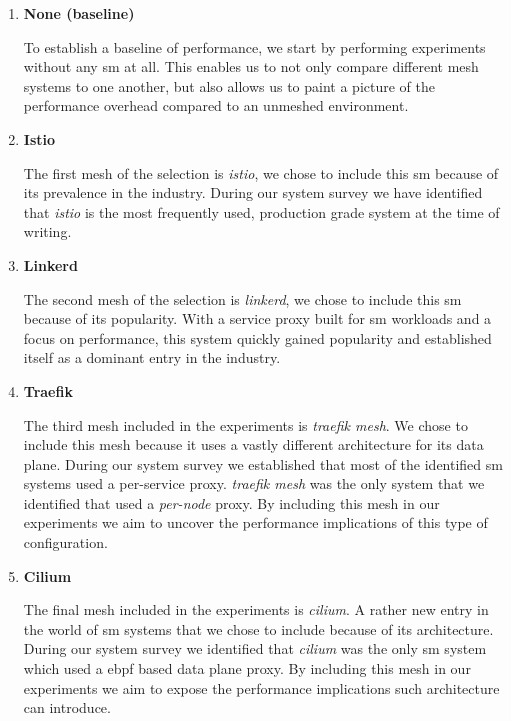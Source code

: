 \begin{enumerate}[label=\textbf{SM\arabic*}, leftmargin=3\parindent]
    \item \textbf{None (baseline)}
    \label{exp:sm:0}
    
    To establish a baseline of performance, we start by performing experiments without any \gls{sm} at all. This enables us to not only compare different mesh systems to one another, but also allows us to paint a picture of the performance overhead compared to an unmeshed environment.
    
    \item \textbf{Istio}
    \label{exp:sm:1}
   
    The first mesh of the selection is \textit{istio}, we chose to include this \gls{sm} because of its prevalence in the industry. During our system survey we have identified that \textit{istio} is the most frequently used, production grade system at the time of writing.
    
    \item \textbf{Linkerd}
    \label{exp:sm:2}
   
    The second mesh of the selection is \textit{linkerd}, we chose to include this \gls{sm} because of its popularity. With a service proxy built for \gls{sm} workloads and a focus on performance, this system quickly gained popularity and established itself as a dominant entry in the industry.

    \item \textbf{Traefik}
    \label{exp:sm:3}
    
    The third mesh included in the experiments is \textit{traefik mesh}. We chose to include this mesh because it uses a vastly different architecture for its data plane. During our system survey we established that most of the identified \gls{sm} systems used a per-service proxy. \textit{traefik mesh} was the only system that we identified that used a \textit{per-node} proxy. By including this mesh in our experiments we aim to uncover the performance implications of this type of configuration.
    
    \item \textbf{Cilium}
    \label{exp:sm:4}
    
    The final mesh included in the experiments is \textit{cilium}. A rather new entry in the world of \gls{sm} systems that we chose to include because of its architecture. During our system survey we identified that \textit{cilium} was the only \gls{sm} system which used a \gls{ebpf} based data plane proxy. By including this mesh in our experiments we aim to expose the performance implications such architecture can introduce.

\end{enumerate}

